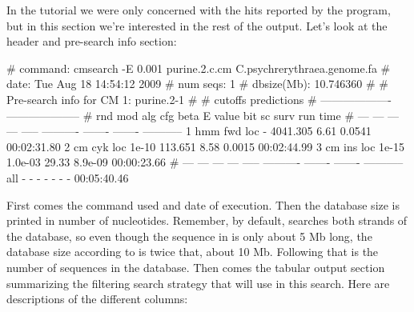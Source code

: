 
In the tutorial we were only concerned with the hits reported by the
program, but in this section we're interested in the rest of the
output. Let's look at the header and pre-search info section:

\begin{sreoutput}
# command:    cmsearch -E 0.001 purine.2.c.cm C.psychrerythraea.genome.fa
# date:       Tue Aug 18 14:54:12 2009
# num seqs:   1
# dbsize(Mb): 10.746360
#
# Pre-search info for CM 1: purine.2-1
#
#                                  cutoffs            predictions     
#                            -------------------  --------------------
# rnd  mod  alg  cfg   beta     E value   bit sc     surv     run time
# ---  ---  ---  ---  -----  ----------  -------  -------  -----------
    1  hmm  fwd  loc      -    4041.305     6.61   0.0541  00:02:31.80
    2   cm  cyk  loc  1e-10     113.651     8.58   0.0015  00:02:44.99
    3   cm  ins  loc  1e-15     1.0e-03    29.33  8.9e-09  00:00:23.66
# ---  ---  ---  ---  -----  ----------  -------  -------  -----------
  all    -    -    -      -           -        -        -  00:05:40.46
\end{sreoutput}

First comes the command used and date of execution. Then the database
size is printed in number of nucleotides. Remember, by default,
 searches both strands of the database, so even though
the sequence in  is only about 5 Mb
long, the database size according to  is twice that,
about 10 Mb. Following that is the number of sequences in the
database. Then comes the tabular output section summarizing the
filtering search strategy that  will use in this
search. Here are descriptions of the different columns:

